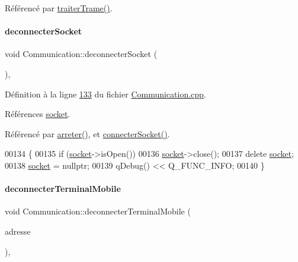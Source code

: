 Référencé par \hyperlink{_communication_8cpp_source_l00208}{traiter\+Trame()}.

\mbox{\label{class_communication_a5280c11bea5ead32e7a7101fd5b0f9b2}} 
\paragraph{\texorpdfstring{deconnecter\+Socket}{deconnecterSocket}}
{\footnotesize\ttfamily void Communication\+::deconnecter\+Socket (\begin{DoxyParamCaption}{ }\end{DoxyParamCaption})\hspace{0.3cm}{\ttfamily [private]}, {\ttfamily [slot]}}



Définition à la ligne \hyperlink{_communication_8cpp_source_l00133}{133} du fichier \hyperlink{_communication_8cpp_source}{Communication.\+cpp}.



Références \hyperlink{_communication_8h_source_l00052}{socket}.



Référencé par \hyperlink{_communication_8cpp_source_l00099}{arreter()}, et \hyperlink{_communication_8cpp_source_l00116}{connecter\+Socket()}.


\begin{DoxyCode}
00134 \{    
00135     \textcolor{keywordflow}{if} (\hyperlink{class_communication_aa4ddc3151b305db0135d5826384645cc}{socket}->isOpen())
00136        \hyperlink{class_communication_aa4ddc3151b305db0135d5826384645cc}{socket}->close();
00137     \textcolor{keyword}{delete} \hyperlink{class_communication_aa4ddc3151b305db0135d5826384645cc}{socket};
00138     \hyperlink{class_communication_aa4ddc3151b305db0135d5826384645cc}{socket} = \textcolor{keyword}{nullptr};
00139     qDebug() << Q\_FUNC\_INFO;
00140 \}
\end{DoxyCode}
\mbox{\label{class_communication_aeeb47bc3c4d7419fefb737168638442e}} 
\paragraph{\texorpdfstring{deconnecter\+Terminal\+Mobile}{deconnecterTerminalMobile}}
{\footnotesize\ttfamily void Communication\+::deconnecter\+Terminal\+Mobile (\begin{DoxyParamCaption}\item[{const Q\+Bluetooth\+Address \&}]{adresse }\end{DoxyParamCaption})\hspace{0.3cm}{\ttfamily [private]}, {\ttfamily [slot]}}

